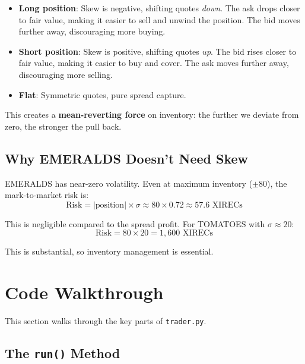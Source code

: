 \documentclass[11pt, letterpaper]{article}
\begin{document}
\begin{itemize}
    \item \textbf{Long position}: Skew is negative, shifting quotes \emph{down}. The ask drops closer to fair value, making it easier to sell and unwind the position. The bid moves further away, discouraging more buying.
    \item \textbf{Short position}: Skew is positive, shifting quotes \emph{up}. The bid rises closer to fair value, making it easier to buy and cover. The ask moves further away, discouraging more selling.
    \item \textbf{Flat}: Symmetric quotes, pure spread capture.
\end{itemize}

This creates a \textbf{mean-reverting force} on inventory: the further we deviate from zero, the stronger the pull back.

\subsection{Why EMERALDS Doesn't Need Skew}

EMERALDS has near-zero volatility. Even at maximum inventory ($\pm 80$), the mark-to-market risk is:
\begin{equation}
    \text{Risk} = |\text{position}| \times \sigma \approx 80 \times 0.72 \approx 57.6 \text{ XIRECs}
\end{equation}

This is negligible compared to the spread profit. For TOMATOES with $\sigma \approx 20$:
\begin{equation}
    \text{Risk} = 80 \times 20 = 1{,}600 \text{ XIRECs}
\end{equation}

This is substantial, so inventory management is essential.


\section{Code Walkthrough}

This section walks through the key parts of \texttt{trader.py}.

\subsection{The \texttt{run()} Method}
\end{document}
